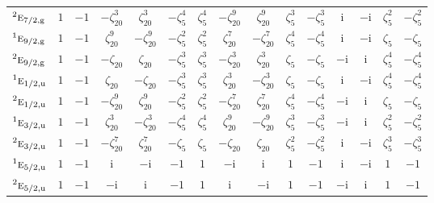 \documentclass[10pt,a4paper]{article}
\numberwithin{equation}{section}
\newcommand{\irr}[1]{\text{\normalfont\scshape #1}}
\newcommand{\conjpair}[1]{{}^{#1}}
\newcommand{\ptag}[1]{\mathrm{#1}}
\newcommand{\iunit}{\mathrm{i}}
\newcommand{\rootunity}[1]{\zeta_{#1}}
\begin{document}
{\begin{longtable}{@{}lcccccccccccccc@{}}
$\conjpair{2}\irr{e}_{7/2,\ptag{g}}$ & $1$ & $-1$ & $-\rootunity{20}^{3}$ & $\rootunity{20}^{3}$ & $-\rootunity{5}^{4}$ & $\rootunity{5}^{4}$ & $-\rootunity{20}^{9}$ & $\rootunity{20}^{9}$ & $\rootunity{5}^{3}$ & $-\rootunity{5}^{3}$ & $\iunit{}$ & $-\iunit{}$ & $\rootunity{5}^{2}$ & $-\rootunity{5}^{2}$\\
$\conjpair{1}\irr{e}_{9/2,\ptag{g}}$ & $1$ & $-1$ & $\rootunity{20}^{9}$ & $-\rootunity{20}^{9}$ & $-\rootunity{5}^{2}$ & $\rootunity{5}^{2}$ & $\rootunity{20}^{7}$ & $-\rootunity{20}^{7}$ & $\rootunity{5}^{4}$ & $-\rootunity{5}^{4}$ & $\iunit{}$ & $-\iunit{}$ & $\rootunity{5}$ & $-\rootunity{5}$\\
$\conjpair{2}\irr{e}_{9/2,\ptag{g}}$ & $1$ & $-1$ & $-\rootunity{20}$ & $\rootunity{20}$ & $-\rootunity{5}^{3}$ & $\rootunity{5}^{3}$ & $-\rootunity{20}^{3}$ & $\rootunity{20}^{3}$ & $\rootunity{5}$ & $-\rootunity{5}$ & $-\iunit{}$ & $\iunit{}$ & $\rootunity{5}^{4}$ & $-\rootunity{5}^{4}$\\
$\conjpair{1}\irr{e}_{1/2,\ptag{u}}$ & $1$ & $-1$ & $\rootunity{20}$ & $-\rootunity{20}$ & $-\rootunity{5}^{3}$ & $\rootunity{5}^{3}$ & $\rootunity{20}^{3}$ & $-\rootunity{20}^{3}$ & $\rootunity{5}$ & $-\rootunity{5}$ & $\iunit{}$ & $-\iunit{}$ & $\rootunity{5}^{4}$ & $-\rootunity{5}^{4}$\\
$\conjpair{2}\irr{e}_{1/2,\ptag{u}}$ & $1$ & $-1$ & $-\rootunity{20}^{9}$ & $\rootunity{20}^{9}$ & $-\rootunity{5}^{2}$ & $\rootunity{5}^{2}$ & $-\rootunity{20}^{7}$ & $\rootunity{20}^{7}$ & $\rootunity{5}^{4}$ & $-\rootunity{5}^{4}$ & $-\iunit{}$ & $\iunit{}$ & $\rootunity{5}$ & $-\rootunity{5}$\\
$\conjpair{1}\irr{e}_{3/2,\ptag{u}}$ & $1$ & $-1$ & $\rootunity{20}^{3}$ & $-\rootunity{20}^{3}$ & $-\rootunity{5}^{4}$ & $\rootunity{5}^{4}$ & $\rootunity{20}^{9}$ & $-\rootunity{20}^{9}$ & $\rootunity{5}^{3}$ & $-\rootunity{5}^{3}$ & $-\iunit{}$ & $\iunit{}$ & $\rootunity{5}^{2}$ & $-\rootunity{5}^{2}$\\
$\conjpair{2}\irr{e}_{3/2,\ptag{u}}$ & $1$ & $-1$ & $-\rootunity{20}^{7}$ & $\rootunity{20}^{7}$ & $-\rootunity{5}$ & $\rootunity{5}$ & $-\rootunity{20}$ & $\rootunity{20}$ & $\rootunity{5}^{2}$ & $-\rootunity{5}^{2}$ & $\iunit{}$ & $-\iunit{}$ & $\rootunity{5}^{3}$ & $-\rootunity{5}^{3}$\\
$\conjpair{1}\irr{e}_{5/2,\ptag{u}}$ & $1$ & $-1$ & $\iunit{}$ & $-\iunit{}$ & $-1$ & $1$ & $-\iunit{}$ & $\iunit{}$ & $1$ & $-1$ & $\iunit{}$ & $-\iunit{}$ & $1$ & $-1$\\
$\conjpair{2}\irr{e}_{5/2,\ptag{u}}$ & $1$ & $-1$ & $-\iunit{}$ & $\iunit{}$ & $-1$ & $1$ & $\iunit{}$ & $-\iunit{}$ & $1$ & $-1$ & $-\iunit{}$ & $\iunit{}$ & $1$ & $-1$\\

\end{longtable}}
\end{document}
